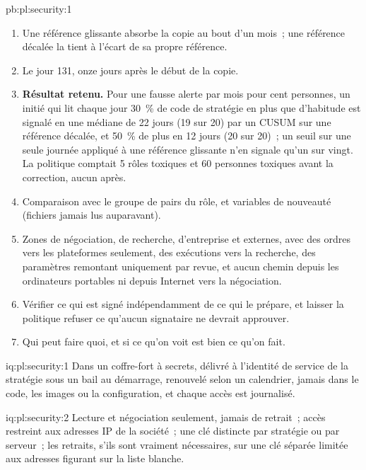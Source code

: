 \begin{solution}{pb:pl:security:1}
\begin{enumerate}
\item Une référence glissante absorbe la copie au bout d'un mois~; une référence décalée la tient à l'écart de sa propre référence.
\item Le jour 131, onze jours après le début de la copie.
\item \textbf{Résultat retenu.} Pour une fausse alerte par mois pour cent personnes, un initié qui lit chaque jour 30~\% de code de stratégie en plus que d'habitude est
signalé en une médiane de 22 jours (19 sur 20) par un CUSUM sur une référence décalée, et 50~\% de plus en 12 jours (20 sur 20)~; un seuil sur une seule journée appliqué à
une référence glissante n'en signale qu'un sur vingt. La politique comptait 5 rôles toxiques et 60 personnes toxiques avant la correction, aucun après.
\item Comparaison avec le groupe de pairs du rôle, et variables de nouveauté (fichiers jamais lus auparavant).
\item Zones de négociation, de recherche, d'entreprise et externes, avec des ordres vers les plateformes seulement, des exécutions vers la recherche, des paramètres remontant uniquement par revue, et
aucun chemin depuis les ordinateurs portables ni depuis Internet vers la négociation.
\item Vérifier ce qui est signé indépendamment de ce qui le prépare, et laisser la politique refuser ce qu'aucun signataire ne devrait approuver.
\item Qui peut faire quoi, et si ce qu'on voit est bien ce qu'on fait.
\end{enumerate}
\end{solution}

\begin{solution}{iq:pl:security:1}
Dans un coffre-fort à secrets, délivré à l'identité de service de la stratégie sous un bail au démarrage, renouvelé selon un calendrier, jamais dans le code, les images ou
la configuration, et chaque accès est journalisé.
\end{solution}

\begin{solution}{iq:pl:security:2}
Lecture et négociation seulement, jamais de retrait~; accès restreint aux adresses IP de la société~; une clé distincte par stratégie ou par serveur~; les retraits, s'ils sont
vraiment nécessaires, sur une clé séparée limitée aux adresses figurant sur la liste blanche.
\end{solution}

